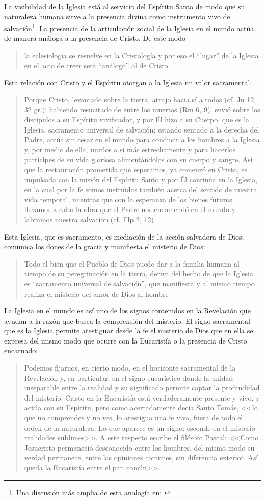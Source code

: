 La visibilidad de la Iglesia está al servicio del Espíritu Santo de modo que su naturaleza humana sirve a la presencia divina como instrumento vivo de salvación\footnote{Una discusión más amplia de esta analogía en: \cite[292-297]{ninot2009tf}}. La presencia de la articulación social de la Iglesia en el mundo actúa de manera análoga a la presencia de Cristo. De este modo \blockquote[{\cite[566]{ninot2009tf}}]{la eclesiología se resuelve en la Cristología y por eso el ``lugar'' de la Iglesia en el acto de creer será ``análogo'' al de Cristo}. Esta relación con Cristo y el Espíritu otorgan a la Iglesia un valor sacramental: \blockquote[][\,(LG 48)]{Porque Cristo, levantado sobre la tierra, atrajo hacia sí a todos (cf. Jn 12, 32 gr.); habiendo resucitado de entre los muertos (Rm 6, 9), envió sobre los discípulos a su Espíritu vivificador, y por Él hizo a su Cuerpo, que es la Iglesia, sacramento universal de salvación; estando sentado a la derecha del Padre, actúa sin cesar en el mundo para conducir a los hombres a la Iglesia y, por medio de ella, unirlos a sí más estrechamente y para hacerlos partícipes de su vida gloriosa alimentándolos con su cuerpo y sangre. Así que la restauración prometida que esperamos, ya comenzó en Cristo, es impulsada con la misión del Espíritu Santo y por Él continúa en la Iglesia, en la cual por la fe somos instruidos también acerca del sentido de nuestra vida temporal, mientras que con la esperanza de los bienes futuros llevamos a cabo la obra que el Padre nos encomendó en el mundo y labramos nuestra salvación (cf. Flp 2, 12)}. Esta Iglesia, que es sacramento, es mediación de la acción salvadora de Dios; comunica los dones de la gracia y manifiesta el misterio de Dios: \blockquote[][\,(GS 45)]{Todo el bien que el Pueblo de Dios puede dar a la familia humana al tiempo de su peregrinación en la tierra, deriva del hecho de que la Iglesia es ``sacramento universal de salvación'', que manifiesta y al mismo tiempo realiza el misterio del amor de Dios al hombre}.

La Iglesia en el mundo es así uno de los signos contenidos en la Revelación que ayudan a la razón que busca la comprensión del misterio. El signo sacramental que es la Iglesia permite atestiguar desde la fe el misterio de Dios que en ella se expresa del mismo modo que ocurre con la Eucaristía o la presencia de Cristo encarnado: \blockquote[][\,(FR 13)]{Podemos fijarnos, en cierto modo, en el horizonte sacramental de la Revelación y, en particular, en el signo eucarístico donde la unidad inseparable entre la realidad y su significado permite captar la profundidad del misterio. Cristo en la Eucaristía está verdaderamente presente y vivo, y actúa con su Espíritu, pero como acertadamente decía Santo Tomás, <<lo que no comprendes y no ves, lo atestigua una fe viva, fuera de todo el orden de la naturaleza. Lo que aparece es un signo: esconde en el misterio realidades sublimes>>. A este respecto escribe el filósofo Pascal: <<Como Jesucristo permaneció desconocido entre los hombres, del mismo modo su verdad permanece, entre las opiniones comunes, sin diferencia exterior. Así queda la Eucaristía entre el pan común>>.}

